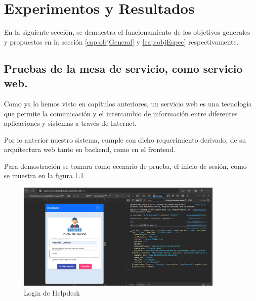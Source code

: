  \chapter{Experimentos y Resultados} 
En la siguiente sección, se demuestra el funcionamiento de los objetivos generales y 
propuestos en la sección \ref{cap:objGeneral} y \ref{cap:objEspec} respectivamente.

\section{Pruebas de la mesa de servicio, como servicio web.}
Como ya lo hemos visto en capítulos anteriores, un servicio web es una tecnología que permite la comunicación y el intercambio de información entre diferentes aplicaciones y sistemas a través de Internet.

Por lo anterior nuestro sistema, cumple con dicho requerimiento derivado, de su arquitectura web tanto en backend, como en el frontend.

Para demostración se tomara como ecenario  de prueba, el inicio de sesión, como se muestra en la figura \ref{fig:lognas}	

 \begin{figure}[H]
	\centering
	\includegraphics[width=0.9\textwidth]{Capitulo7/Img/login}
	\caption{Login de Helpdesk}
	\label{fig:lognas}
\end{figure}
